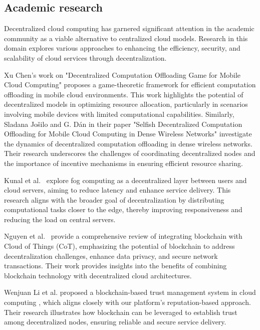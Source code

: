 \subsection{Academic research}

Decentralized cloud computing has garnered significant attention in the academic community as a viable alternative to centralized cloud models. Research in this domain explores various approaches to enhancing the efficiency, security, and scalability of cloud services through decentralization.

Xu Chen's work on "Decentralized Computation Offloading Game for Mobile Cloud Computing" \cite{chen2014decentralized} proposes a game-theoretic framework for efficient computation offloading in mobile cloud environments. This work highlights the potential of decentralized models in optimizing resource allocation, particularly in scenarios involving mobile devices with limited computational capabilities.
Similarly, Sladana Jošilo and G. Dán in their paper "Selfish Decentralized Computation Offloading for Mobile Cloud Computing in Dense Wireless Networks" \cite{josilo2018selfish} investigate the dynamics of decentralized computation offloading in dense wireless networks. Their research underscores the challenges of coordinating decentralized nodes and the importance of incentive mechanisms in ensuring efficient resource sharing.

Kunal et al.~\cite{kunal2019overview} explore fog computing as a decentralized layer between users and cloud servers, aiming to reduce latency and enhance service delivery. This research aligns with the broader goal of decentralization by distributing computational tasks closer to the edge, thereby improving responsiveness and reducing the load on central servers.

Nguyen et al.~\cite{nguyen2020integration} provide a comprehensive review of integrating blockchain with Cloud of Things (CoT), emphasizing the potential of blockchain to address decentralization challenges, enhance data privacy, and secure network transactions. Their work provides insights into the benefits of combining blockchain technology with decentralized cloud architectures.

Wenjuan Li et al. proposed a blockchain-based trust management system in cloud computing \cite{li2021blockchain}, which aligns closely with our platform's reputation-based approach. Their research illustrates how blockchain can be leveraged to establish trust among decentralized nodes, ensuring reliable and secure service delivery.

